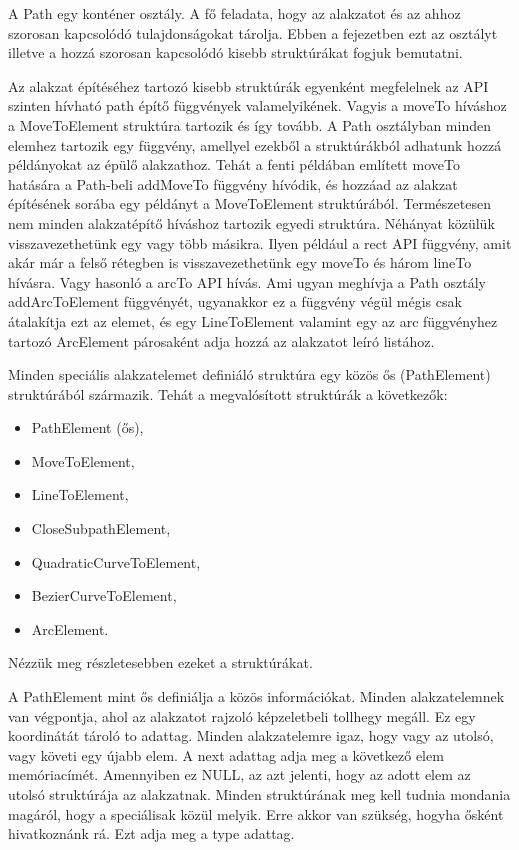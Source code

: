 \documentclass[12pt]{report}
\theoremstyle{definition}
\newcommand{\func}[1]{{\textsf{\footnotesize{#1}}}}
\begin{document}
A \func{Path} egy konténer osztály. A fő feladata, hogy az alakzatot és az
ahhoz szorosan kapcsolódó tulajdonságokat tárolja. Ebben a fejezetben ezt az
osztályt illetve a hozzá szorosan kapcsolódó kisebb struktúrákat fogjuk
bemutatni.

Az alakzat építéséhez tartozó kisebb struktúrák egyenként megfelelnek az API
szinten hívható path építő függvények valamelyikének. Vagyis a \func{moveTo}
híváshoz a \func{MoveToElement} struktúra tartozik és így tovább. A \func{Path}
osztályban minden elemhez tartozik egy függvény, amellyel ezekből a
struktúrákból adhatunk hozzá példányokat az épülő alakzathoz. Tehát a fenti
példában említett \func{moveTo} hatására a \func{Path}-beli \func{addMoveTo}
függvény hívódik, és hozzáad az alakzat építésének sorába egy példányt a
\func{MoveToElement} struktúrából. Természetesen nem minden alakzatépítő
híváshoz tartozik egyedi struktúra. Néhányat közülük visszavezethetünk egy vagy
több másikra. Ilyen például a \func{rect} API függvény, amit akár már a felső
rétegben is visszavezethetünk egy \func{moveTo} és három \func{lineTo} hívásra.
Vagy hasonló a \func{arcTo} API hívás. Ami ugyan meghívja a \func{Path} osztály
\func{addArcToElement} függvényét, ugyanakkor ez a függvény végül mégis csak
átalakítja ezt az elemet, és egy \func{LineToElement} valamint egy az
\func{arc} függvényhez tartozó \func{ArcElement} párosaként adja hozzá az
alakzatot leíró listához.

Minden speciális alakzatelemet definiáló struktúra egy közös ős
(\func{PathElement}) struktúrából származik. Tehát a megvalósított struktúrák a
következők:
    \begin{itemize}[noitemsep]
      \item \func{PathElement} (ős),
      \item \func{MoveToElement},
      \item \func{LineToElement},
      \item \func{CloseSubpathElement},
      \item \func{QuadraticCurveToElement},
      \item \func{BezierCurveToElement},
      \item \func{ArcElement}.
    \end{itemize}
Nézzük meg részletesebben ezeket a struktúrákat.

A \func{PathElement} mint ős definiálja a közös információkat. Minden
alakzatelemnek van végpontja, ahol az alakzatot rajzoló képzeletbeli tollhegy
megáll. Ez egy koordinátát tároló \func{to} adattag. Minden alakzatelemre igaz,
hogy vagy az utolsó, vagy követi egy újabb elem. A \func{next} adattag adja meg
a következő elem memóriacímét. Amennyiben ez \func{NULL}, az azt jelenti, hogy
az adott elem az utolsó struktúrája az alakzatnak. Minden struktúrának meg kell
tudnia mondania magáról, hogy a speciálisak közül melyik. Erre akkor van
szükség, hogyha ősként hivatkoznánk rá. Ezt adja meg a \func{type} adattag.
\end{document}
